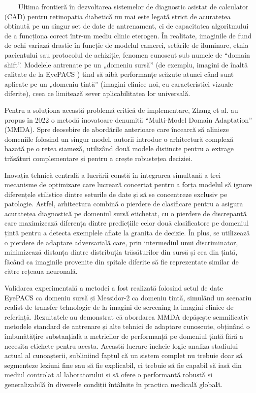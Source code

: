 \documentclass[12pt, a4paper, twoside, romanian]{teza-upb}
\begin{document}
\ \ \ \ Ultima frontieră în dezvoltarea sistemelor de diagnostic asistat de calculator (CAD) pentru
retinopatia diabetică nu mai este legată strict de acuratețea obținută pe un
singur set de date de
antrenament, ci de capacitatea algoritmului de a funcționa corect într-un mediu clinic eterogen. În
realitate, imaginile de fund de ochi variază drastic în funcție de modelul camerei, setările de iluminare,
etnia pacientului sau protocolul de achiziție, fenomen cunoscut sub numele de “domain shift”. Modelele
antrenate pe un „domeniu sursă” (de exemplu, imagini de înaltă calitate de
la EyePACS \cite{9_chetoui2020explainable}) tind să aibă
performanțe scăzute atunci când sunt aplicate pe un „domeniu țintă” (imagini clinice noi, cu
caracteristici vizuale diferite), ceea ce limitează sever aplicabilitatea lor universală.
\bigskip

Pentru a soluționa această problemă critică de implementare, Zhang et al. \cite{8_zhang2022multi} au propus în 2022
o metodă inovatoare denumită “Multi-Model Domain Adaptation” (MMDA). Spre deosebire de
abordările anterioare care încearcă să alinieze domeniile folosind un singur model, autorii introduc o
arhitectură complexă bazată pe o rețea siameză, utilizând două modele distincte pentru a extrage
trăsături complementare și pentru a crește robustețea deciziei.
\bigskip

Inovația tehnică centrală a lucrării constă în integrarea simultană a trei mecanisme de optimizare
care lucrează concertat pentru a forța modelul să ignore diferențele stilistice dintre
seturile de date și să
se concentreze exclusiv pe patologie. Astfel, arhitectura combină o pierdere de clasificare pentru a
asigura acuratețea diagnostică pe domeniul sursă etichetat, cu o pierdere de discrepanță care
maximizează diferența dintre predicțiile celor două clasificatore pe domeniul țintă pentru a detecta
exemplele aflate la granița de decizie. În plus, se utilizează o pierdere
de adaptare adversarială care, prin
intermediul unui discriminator, minimizează distanța dintre distribuția trăsăturilor din sursă și cea din
țintă, făcând ca imaginile provenite din spitale diferite să fie reprezentate similar de către rețeaua
neuronală.
\bigskip

Validarea experimentală a metodei a fost realizată folosind setul de date EyePACS \cite{9_chetoui2020explainable} ca domeniu
sursă și Messidor-2 \cite{9_chetoui2020explainable} ca domeniu țintă, simulând un scenariu realist de
transfer tehnologic de la imagini
de screening la imagini clinice de referință. Rezultatele au demonstrat că abordarea MMDA depășește
semnificativ metodele standard de antrenare și alte tehnici de adaptare cunoscute, obținând o
îmbunătățire substanțială a metricilor de performanță pe domeniul țintă fără a necesita etichete pentru
acesta. Această lucrare încheie logic analiza stadiului actual al cunoașterii, subliniind faptul că un sistem
complet nu trebuie doar să segmenteze leziuni fine sau să fie explicabil,
ci trebuie să fie capabil să iasă
din mediul controlat al laboratorului și să ofere o performanță robustă și generalizabilă în diversele
condiții întâlnite în practica medicală globală.
\end{document}
